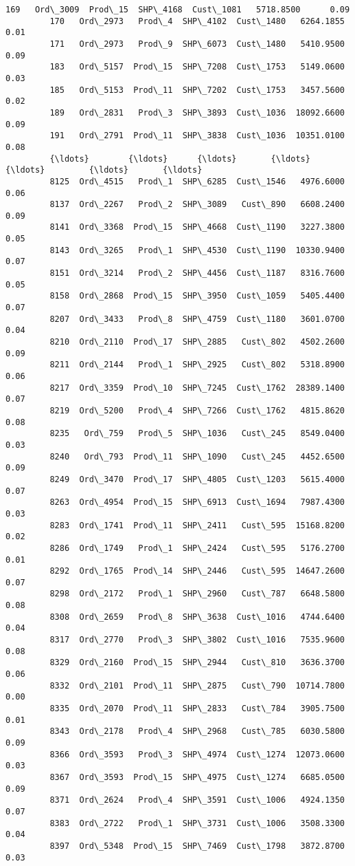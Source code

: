 \documentclass[11pt]{article}
\begin{document}
\begin{Verbatim}[commandchars=\\\{\}]
         169   Ord\_3009  Prod\_15  SHP\_4168  Cust\_1081   5718.8500      0.09   
         170   Ord\_2973   Prod\_4  SHP\_4102  Cust\_1480   6264.1855      0.01   
         171   Ord\_2973   Prod\_9  SHP\_6073  Cust\_1480   5410.9500      0.09   
         183   Ord\_5157  Prod\_15  SHP\_7208  Cust\_1753   5149.0600      0.03   
         185   Ord\_5153  Prod\_11  SHP\_7202  Cust\_1753   3457.5600      0.02   
         189   Ord\_2831   Prod\_3  SHP\_3893  Cust\_1036  18092.6600      0.09   
         191   Ord\_2791  Prod\_11  SHP\_3838  Cust\_1036  10351.0100      0.08   
         {\ldots}        {\ldots}      {\ldots}       {\ldots}        {\ldots}         {\ldots}       {\ldots}   
         8125  Ord\_4515   Prod\_1  SHP\_6285  Cust\_1546   4976.6000      0.06   
         8137  Ord\_2267   Prod\_2  SHP\_3089   Cust\_890   6608.2400      0.09   
         8141  Ord\_3368  Prod\_15  SHP\_4668  Cust\_1190   3227.3800      0.05   
         8143  Ord\_3265   Prod\_1  SHP\_4530  Cust\_1190  10330.9400      0.07   
         8151  Ord\_3214   Prod\_2  SHP\_4456  Cust\_1187   8316.7600      0.05   
         8158  Ord\_2868  Prod\_15  SHP\_3950  Cust\_1059   5405.4400      0.07   
         8207  Ord\_3433   Prod\_8  SHP\_4759  Cust\_1180   3601.0700      0.04   
         8210  Ord\_2110  Prod\_17  SHP\_2885   Cust\_802   4502.2600      0.09   
         8211  Ord\_2144   Prod\_1  SHP\_2925   Cust\_802   5318.8900      0.06   
         8217  Ord\_3359  Prod\_10  SHP\_7245  Cust\_1762  28389.1400      0.07   
         8219  Ord\_5200   Prod\_4  SHP\_7266  Cust\_1762   4815.8620      0.08   
         8235   Ord\_759   Prod\_5  SHP\_1036   Cust\_245   8549.0400      0.03   
         8240   Ord\_793  Prod\_11  SHP\_1090   Cust\_245   4452.6500      0.09   
         8249  Ord\_3470  Prod\_17  SHP\_4805  Cust\_1203   5615.4000      0.07   
         8263  Ord\_4954  Prod\_15  SHP\_6913  Cust\_1694   7987.4300      0.03   
         8283  Ord\_1741  Prod\_11  SHP\_2411   Cust\_595  15168.8200      0.02   
         8286  Ord\_1749   Prod\_1  SHP\_2424   Cust\_595   5176.2700      0.01   
         8292  Ord\_1765  Prod\_14  SHP\_2446   Cust\_595  14647.2600      0.07   
         8298  Ord\_2172   Prod\_1  SHP\_2960   Cust\_787   6648.5800      0.08   
         8308  Ord\_2659   Prod\_8  SHP\_3638  Cust\_1016   4744.6400      0.04   
         8317  Ord\_2770   Prod\_3  SHP\_3802  Cust\_1016   7535.9600      0.08   
         8329  Ord\_2160  Prod\_15  SHP\_2944   Cust\_810   3636.3700      0.06   
         8332  Ord\_2101  Prod\_11  SHP\_2875   Cust\_790  10714.7800      0.00   
         8335  Ord\_2070  Prod\_11  SHP\_2833   Cust\_784   3905.7500      0.01   
         8343  Ord\_2178   Prod\_4  SHP\_2968   Cust\_785   6030.5800      0.09   
         8366  Ord\_3593   Prod\_3  SHP\_4974  Cust\_1274  12073.0600      0.03   
         8367  Ord\_3593  Prod\_15  SHP\_4975  Cust\_1274   6685.0500      0.09   
         8371  Ord\_2624   Prod\_4  SHP\_3591  Cust\_1006   4924.1350      0.07   
         8383  Ord\_2722   Prod\_1  SHP\_3731  Cust\_1006   3508.3300      0.04   
         8397  Ord\_5348  Prod\_15  SHP\_7469  Cust\_1798   3872.8700      0.03   
         

\end{Verbatim}
\end{document}
